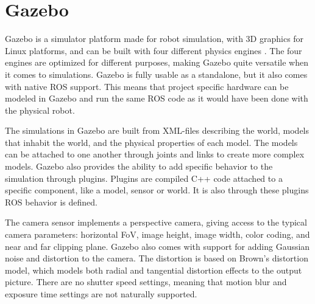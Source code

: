 \section{Gazebo} \label{sec:Gazebo}

Gazebo is a simulator platform made for robot simulation, with 3D graphics for Linux platforms, and can be built with four different physics engines \cite{Gazebo_phys}. The four engines are optimized for different purposes, making Gazebo quite versatile when it comes to simulations. Gazebo is fully usable as a standalone, but it also comes with native ROS support. This means that project specific hardware can be modeled in Gazebo and run the same ROS code as it would have been done with the physical robot.

The simulations in Gazebo are built from XML-files describing the world, models that inhabit the world, and the physical properties of each model. The models can be attached to one another through joints and links to create more complex models. Gazebo also provides the ability to add specific behavior to the simulation through plugins. Plugins are compiled C++ code attached to a specific component, like a model, sensor or world. It is also through these plugins ROS behavior is defined.

The camera sensor implements a perspective camera, giving access to the typical camera parameters: horizontal FoV, image height, image width, color coding, and near and far clipping plane. Gazebo also comes with support for adding Gaussian noise and distortion to the camera. The distortion is based on Brown's distortion model\cite{BrownModel}, which models both radial and tangential distortion effects to the output picture. There are no shutter speed settings, meaning that motion blur and exposure time settings are not naturally supported.

